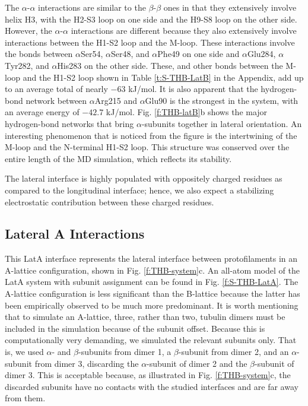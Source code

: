 \documentclass[11pt]{report}
\begin{document}
The $\alpha$-$\alpha$ interactions are similar to the $\beta$-$\beta$ ones in that
they extensively involve helix H3, with the H2-S3 loop on one side and the H9-S8 loop on the other side. However,
the
$\alpha$-$\alpha$ interactions are different because they also extensively involve interactions between the H1-S2 loop and the M-loop. These interactions involve the bonds between $\alpha$Ser54, $\alpha$Ser48, and $\alpha$Phe49 on one side and $\alpha$Glu284, $\alpha$Tyr282, and $\alpha$His283 on the other side. These, and other bonds between the M-loop and the H1-S2 loop shown in Table
\ref{t:S-THB-LatB}
in the Appendix, add up to an average total of nearly $-63$ kJ/mol. It is also apparent that the hydrogen-bond network between $\alpha$Arg215 and $\alpha$Glu90 is the strongest in the system, with an average energy of $-42.7$ kJ/mol. Fig.
\ref{f:THB-latB}b shows the major hydrogen-bond networks that bring $\alpha$-subunits together in lateral orientation. An interesting phenomenon that is noticed from the figure is the intertwining of the M-loop and the N-terminal H1-S2 loop. This structure was conserved over the entire length of the MD simulation, which reflects its stability. 

The lateral interface is highly populated with oppositely charged residues as compared to the longitudinal interface; hence, we also
expect a stabilizing electrostatic contribution between these charged residues.

\subsection{Lateral A Interactions}
\label{ss:THB-LatA}

This LatA interface represents the lateral interface between protofilaments in an A-lattice configuration, shown in Fig. 
\ref{f:THB-system}c. An all-atom model of the LatA system with subunit assignment can be found in Fig.
\ref{f:S-THB-LatA}. 
The A-lattice configuration is less significant than the B-lattice because the latter has been empirically observed to be much more predominant. It is worth mentioning that to simulate an A-lattice, three, rather than two, tubulin dimers must be included in the simulation because of the subunit offset. Because this is computationally very demanding, we simulated the relevant subunits only. That is, we used $\alpha$- and $\beta$-subunits from dimer 1, a $\beta$-subunit from dimer 2, and an $\alpha$-subunit from dimer 3, discarding the $\alpha$-subunit of dimer 2 and the $\beta$-subunit of dimer 3. This is acceptable because, as illustrated in Fig.
\ref{f:THB-system}c, 
the discarded subunits have no contacts with the studied interfaces and are far away from them.
\end{document}
